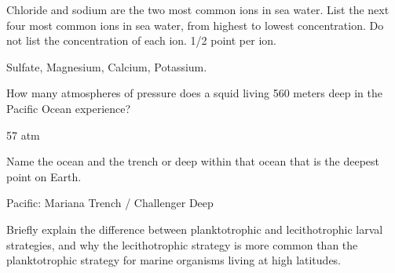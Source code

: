 \documentclass[12pt,addpoints]{exam}
\newcommand*\AnswerBox[2]{%
    \parbox[t][#1]{0.92\textwidth}{%
    \begin{solution}#2\end{solution}}
    \vspace{\stretch{1}}
}
\begin{document}
\begin{questions}

\vspace*{-1\baselineskip}


\question[2]
Chloride and sodium are the two most common ions in sea water. List the next four most common ions in sea water, from highest to lowest concentration. Do not list the concentration of each ion. 1/2 point per ion.

	\AnswerBox{0.1\textheight}{%
	Sulfate, Magnesium, Calcium, Potassium.
}


\question[3]
How many atmospheres of pressure does a squid living 560 meters deep in the Pacific Ocean experience?

\AnswerBox{\baselineskip}{57 atm}

\question[3]
Name the ocean and the trench or deep within that ocean that is the deepest point on Earth.

\AnswerBox{\baselineskip}{Pacific: Mariana Trench / Challenger Deep}


%
%

\question[6]
Briefly explain the difference between planktotrophic and lecithotrophic larval strategies, and why the lecithotrophic strategy is more common than the planktotrophic strategy for marine organisms living at high latitudes. 


\end{questions}
\end{document}
